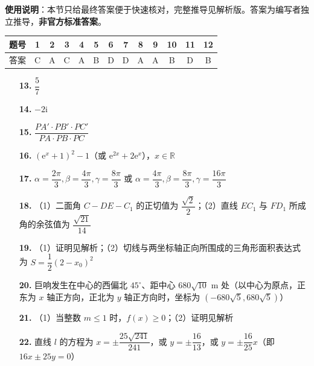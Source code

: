 
\begin{gknotice}
\textbf{使用说明}：本节只给最终答案便于快速核对，完整推导见解析版。答案为编写者独立推导，\textbf{非官方标准答案}。
\end{gknotice}

\begin{center}\begin{tabular}{ccccccccccccc}
\toprule
题号 & 1 & 2 & 3 & 4 & 5 & 6 & 7 & 8 & 9 & 10 & 11 & 12 \\
\midrule
答案 & C & A & C & A & B & D & D & A & A & B & D & B \\
\bottomrule
\end{tabular}\end{center}

\begin{itemize}[leftmargin=2.6em]
  \item[\textbf{13.}] $\dfrac{5}{7}$
  \item[\textbf{14.}] $-2\mathrm{i}$
  \item[\textbf{15.}] $\dfrac{PA' \cdot PB' \cdot PC'}{PA \cdot PB \cdot PC}$
  \item[\textbf{16.}] $(\mathrm{e}^x + 1)^2 - 1$（或 $\mathrm{e}^{2x} + 2\mathrm{e}^x$），$x \in \mathbb{R}$
\end{itemize}

\begin{itemize}[leftmargin=2.6em]
  \item[\textbf{17.}] $\alpha = \dfrac{2\pi}{3}, \beta = \dfrac{4\pi}{3}, \gamma = \dfrac{8\pi}{3}$ 或 $\alpha = \dfrac{4\pi}{3}, \beta = \dfrac{8\pi}{3}, \gamma = \dfrac{16\pi}{3}$
  \item[\textbf{18.}] （1）二面角 $C - DE - C_1$ 的正切值为 $\dfrac{\sqrt{2}}{2}$；（2）直线 $EC_1$ 与 $FD_1$ 所成角的余弦值为 $\dfrac{\sqrt{21}}{14}$
  \item[\textbf{19.}] （1）证明见解析；（2）切线与两坐标轴正向所围成的三角形面积表达式为 $S = \dfrac{1}{2}(2 - x_0)^2$
  \item[\textbf{20.}] 巨响发生在中心的西偏北 $45^\circ$、距中心 $680\sqrt{10}\text{ m}$ 处（以中心为原点，正东为 $x$ 轴正方向，正北为 $y$ 轴正方向时，坐标为 $(-680\sqrt{5}, 680\sqrt{5})$）
  \item[\textbf{21.}] （1）当整数 $m \leqslant 1$ 时，$f(x) \geqslant 0$；（2）证明见解析
  \item[\textbf{22.}] 直线 $l$ 的方程为 $x = \pm \dfrac{25\sqrt{241}}{241}$，或 $y = \pm \dfrac{16}{13}$，或 $y = \pm \dfrac{16}{25}x$（即 $16x \pm 25y = 0$）
\end{itemize}
